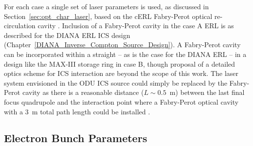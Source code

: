 \documentclass[../main.tex]{subfiles}
\begin{document}
For each case a single set of laser parameters is used, as discussed in Section~\ref{sec:opt_char_laser}, based on the cERL Fabry-Perot optical re-circulation cavity \cite{akagi2016narrow}. Inclusion of a Fabry-Perot cavity in the case A ERL is as described for the DIANA ERL ICS design (Chapter~\ref{DIANA_Inverse_Compton_Source_Design}). A Fabry-Perot cavity can be incorporated within a straight -- as is the case for the DIANA ERL -- in a design like the MAX-III storage ring in case B, though proposal of a detailed optics scheme for ICS interaction are beyond the scope of this work. The laser system envisioned in the ODU ICS source \cite{krafft2016laser,deitrick2017inverse,deitrick2018high} could simply be replaced by the Fabry-Perot cavity as there is a reasonable distance ($L\sim0.5$~\si{\meter}) between the last final focus quadrupole and the interaction point where a Fabry-Perot optical cavity with a 3~\si{\meter} total path length could be installed \cite{deitrick2018high}.

\subsection{Electron Bunch Parameters}
\end{document}

